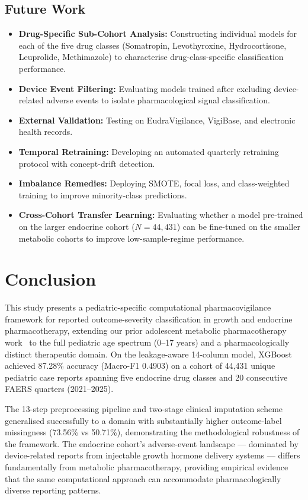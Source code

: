 \documentclass[10pt,twocolumn]{article}
\begin{document}
\subsection{Future Work}
\label{sec:future}
\begin{itemize}[leftmargin=*]
\item \textbf{Drug-Specific Sub-Cohort Analysis:} Constructing individual models for each of the five drug classes (Somatropin, Levothyroxine, Hydrocortisone, Leuprolide, Methimazole) to characterise drug-class-specific classification performance.
\item \textbf{Device Event Filtering:} Evaluating models trained after excluding device-related adverse events to isolate pharmacological signal classification.
\item \textbf{External Validation:} Testing on EudraVigilance, VigiBase, and electronic health records.
\item \textbf{Temporal Retraining:} Developing an automated quarterly retraining protocol with concept-drift detection.
\item \textbf{Imbalance Remedies:} Deploying SMOTE, focal loss, and class-weighted training to improve minority-class predictions.
\item \textbf{Cross-Cohort Transfer Learning:} Evaluating whether a model pre-trained on the larger endocrine cohort ($N = 44{,}431$) can be fine-tuned on the smaller metabolic cohorts to improve low-sample-regime performance.
\end{itemize}
 
\section{Conclusion}
 
This study presents a pediatric-specific computational pharmacovigilance framework for reported outcome-severity classification in growth and endocrine pharmacotherapy, extending our prior adolescent metabolic pharmacotherapy work~\cite{telkar2026obesity} to the full pediatric age spectrum (0--17 years) and a pharmacologically distinct therapeutic domain. On the leakage-aware 14-column model, XGBoost achieved 87.28\% accuracy (Macro-F1 0.4903) on a cohort of 44{,}431 unique pediatric case reports spanning five endocrine drug classes and 20 consecutive FAERS quarters (2021--2025).
 
The 13-step preprocessing pipeline and two-stage clinical imputation scheme generalised successfully to a domain with substantially higher outcome-label missingness (73.56\% vs 50.71\%), demonstrating the methodological robustness of the framework. The endocrine cohort's adverse-event landscape --- dominated by device-related reports from injectable growth hormone delivery systems --- differs fundamentally from metabolic pharmacotherapy, providing empirical evidence that the same computational approach can accommodate pharmacologically diverse reporting patterns.
 
\end{document}
